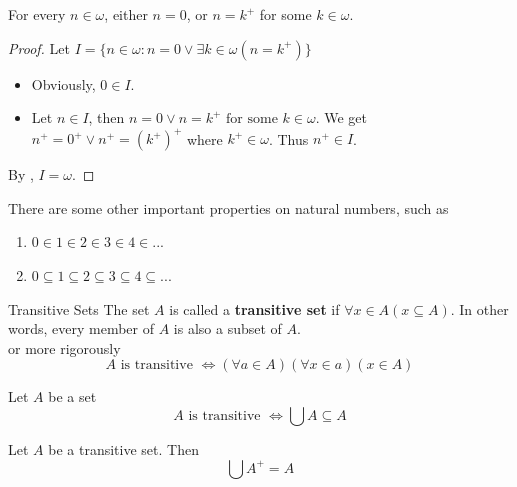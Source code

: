 \begin{proposition}{}{}
    For every $n \in \omega$, either $n = 0$, or $n = k^{+}$ for 
    some $k \in \omega$.
\end{proposition}

\begin{proof}
    Let $I = \{n \in \omega: n = 0 \lor \exists k \in \omega(n = k^{+})\}$\\
    \begin{itemize}

        \item Obviously, $0 \in I$.
        \item Let $n \in I$, then $n = 0 \lor n = k^{+} \text{ for some } k \in \omega$. 
        We get $n^{+} = 0^{+} \lor n^{+} = (k^{+})^{+}$
        where $k^{+} \in \omega$. Thus $n^{+} \in I$.

    \end{itemize}
    By , $I = \omega$.
\end{proof}

There are some other important properties on natural numbers, such as

\begin{enumerate}

    \item $0 \in 1 \in 2 \in 3 \in 4 \in ...$
    \item $0 \subseteq 1 \subseteq 2 \subseteq 3 \subseteq 4 \subseteq ...$ 
    
\end{enumerate}

\begin{definition}{Transitive Sets}{}
    The set $A$ is called a \textbf{transitive set} if $\forall x \in A(x \subseteq A)$. In other words, every member of $A$ is also a subset of $A$.\\
    or more rigorously
    \begin{equation*}
        A \text{ is transitive } \iff (\forall a \in A)(\forall x \in a)(x \in A)
    \end{equation*}
\end{definition}

\begin{proposition}{}{}
    Let $A$ be a set
    \begin{equation*}
        A \text{ is transitive } \iff \bigcup A \subseteq A 
    \end{equation*}
\end{proposition}

\begin{proposition}{}{}
    Let $A$ be a transitive set. Then
    \begin{equation*}
        \bigcup A^{+} = A
    \end{equation*}
\end{proposition}

